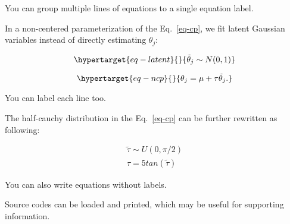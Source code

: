 \documentclass[
  12pt,
  letterpaper,
  DIV=11,
  numbers=noendperiod]{scrartcl}
\begin{document}
You can group multiple lines of equations to a single equation label.

In a non-centered parameterization of the Eq.~\ref{eq-cp}, we fit latent
Gaussian variables instead of directly estimating \(\theta_j\):

\begin{equation}\protect\hypertarget{eq-latent}{}{
\tilde{\theta}_j \sim N(0, 1)
}\label{eq-latent}\end{equation}

\begin{equation}\protect\hypertarget{eq-ncp}{}{
\theta_j = \mu + \tau \tilde{\theta}_j.
}\label{eq-ncp}\end{equation}

You can label each line too.

The half-cauchy distribution in the Eq.~\ref{eq-cp} can be further
rewritten as following:

\[
\begin{aligned}
\tilde{\tau} \sim U(0, \pi / 2) \\
\tau = 5 tan(\tilde{\tau})
\end{aligned}
\]

You can also write equations without labels.

Source codes can be loaded and printed, which may be useful for
supporting information.
\end{document}
